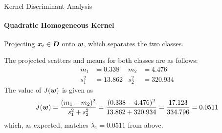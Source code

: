 \begin{frame}[fragile]{Kernel Discriminant Analysis}
\framesubtitle{Quadratic Homogeneous Kernel}

Projecting ${\boldsymbol x}_i \in {\boldsymbol D}$  onto ${\boldsymbol w}$, which separates the two classes.

\smallskip

The projected scatters and means for both classes are as follows:
    \begin{align*}
        m_1 & = 0.338 & m_2 & = 4.476\\
        s_1^2 & = 13.862 & s_2^2 & = 320.934
    \end{align*}
    The value of $J({\boldsymbol w})$ is given as
    \begin{align*}
        J({\boldsymbol w}) = {(m_1-m_2)^2 \over s_1^2+s_2^2} =
        {(0.338-4.476)^2 \over 13.862+320.934} = {17.123 \over
        334.796} = 0.0511
    \end{align*}
    which,  as expected, matches $\lambda_1 = 0.0511$ from above.

\begin{figure}
\end{figure}
\end{frame}



